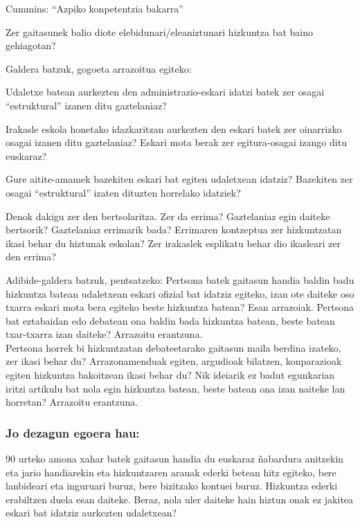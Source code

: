 \documentclass[
]{book}
\begin{document}
Cummins: ``Azpiko konpetentzia bakarra''

Zer gaitasunek balio diote elebidunari/eleaniztunari hizkuntza bat baino gehiagotan?

Galdera batzuk, gogoeta arrazoitua egiteko:

Udaletxe batean aurkezten den administrazio-eskari idatzi batek zer osagai ``estruktural'' izanen ditu gaztelaniaz?

Irakasle eskola honetako idazkaritzan aurkezten den eskari batek zer oinarrizko osagai izanen ditu gaztelaniaz?
Eskari mota berak zer egitura-osagai izango ditu euskaraz?

Gure aitite-amamek bazekiten eskari bat egiten udaletxean idatziz? Bazekiten zer osagai ``estruktural'' izaten dituzten horrelako idatziek?

Denok dakigu zer den bertsolaritza. Zer da errima? Gaztelaniaz egin daiteke bertsorik? Gaztelaniaz errimarik bada? Errimaren kontzeptua zer hizkuntzatan ikasi behar du hiztunak eskolan? Zer irakaslek esplikatu behar dio ikasleari zer den errima?

Adibide-galdera batzuk, pentsatzeko:
Pertsona batek gaitasun handia baldin badu hizkuntza batean udaletxean eskari ofizial bat idatziz egiteko, izan ote daiteke oso txarra eskari mota bera egiteko beste hizkuntza batean? Esan arrazoiak.
Pertsona bat eztabaidan edo debatean ona baldin bada hizkuntza batean, beste batean txar-txarra izan daiteke? Arrazoitu erantzuna.\\
Pertsona horrek bi hizkuntzatan debateetarako gaitasun maila berdina izateko, zer ikasi behar du? Arrazonamenduak egiten, argudioak bilatzen, konparazioak egiten hizkuntza bakoitzean ikasi behar du?
Nik ideiarik ez badut egunkarian iritzi artikulu bat nola egin hizkuntza batean, beste batean ona izan naiteke lan horretan? Arrazoitu erantzuna.

\hypertarget{jo-dezagun-egoera-hau}{%
\subsubsection*{Jo dezagun egoera hau:}\label{jo-dezagun-egoera-hau}}

90 urteko amona xahar batek gaitasun handia du euskaraz ñabardura anitzekin eta jario handiarekin eta hizkuntzaren arauak ederki betean hitz egiteko, bere lanbideari eta inguruari buruz, bere bizitzako kontuei buruz. Hizkuntza ederki erabiltzen duela esan daiteke. Beraz, nola uler daiteke hain hiztun onak ez jakitea eskari bat idatziz aurkezten udaletxean?
\end{document}
